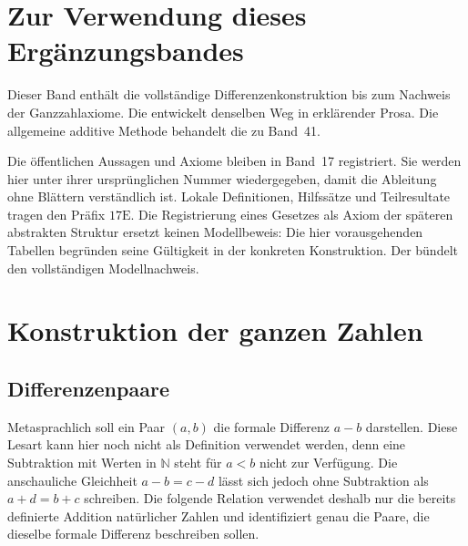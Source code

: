 \chapter*{Zur Verwendung dieses Ergänzungsbandes}
Dieser Band enthält die vollständige Differenzenkonstruktion bis zum
Nachweis der Ganzzahlaxiome. Die \IntegersReadingLink{} entwickelt
denselben Weg in erklärender Prosa. Die allgemeine additive Methode
behandelt die \DifferencesReadingLink{} zu Band~41.

Die öffentlichen Aussagen und Axiome bleiben in Band~17 registriert.
Sie werden hier unter ihrer ursprünglichen Nummer wiedergegeben,
damit die Ableitung ohne Blättern verständlich ist. Lokale Definitionen,
Hilfssätze und Teilresultate tragen den Präfix \(17\mathrm E\).
Die Registrierung eines Gesetzes als Axiom der späteren abstrakten
Struktur ersetzt keinen Modellbeweis: Die hier vorausgehenden Tabellen
begründen seine Gültigkeit in der konkreten Konstruktion.
Der \IntegersMainLink{} bündelt den vollständigen Modellnachweis.

\setcounter{chapter}{1}
\chapter{Konstruktion der ganzen Zahlen}

\section{Differenzenpaare}

\par{}
\hypertarget{integers.statement.IntegerPairCarrier}{}

Metasprachlich soll ein Paar \((a,b)\) die formale Differenz \(a-b\)
darstellen. Diese Lesart kann hier noch nicht als Definition verwendet
werden, denn eine Subtraktion mit Werten in \(\mathbb N\) steht für
\(a<b\) nicht zur Verfügung. Die anschauliche Gleichheit
\(a-b=c-d\) lässt sich jedoch ohne Subtraktion als
\(a+d=b+c\) schreiben. Die folgende Relation verwendet deshalb nur die
bereits definierte Addition natürlicher Zahlen und identifiziert genau die
Paare, die dieselbe formale Differenz beschreiben sollen.

